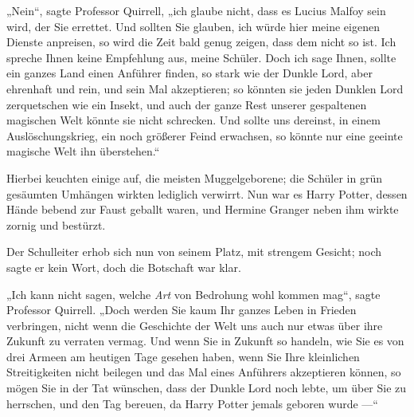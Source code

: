 „Nein“, sagte Professor Quirrell, „ich glaube nicht, dass es Lucius Malfoy sein wird, der Sie errettet. Und sollten Sie glauben, ich würde hier meine eigenen Dienste anpreisen, so wird die Zeit bald genug zeigen, dass dem nicht so ist. Ich spreche Ihnen keine Empfehlung aus, meine Schüler. Doch ich sage Ihnen, sollte ein ganzes Land einen Anführer finden, so stark wie der Dunkle Lord, aber ehrenhaft und rein, und sein Mal akzeptieren; so könnten sie jeden Dunklen Lord zerquetschen wie ein Insekt, und auch der ganze Rest unserer gespaltenen magischen Welt könnte sie nicht schrecken. Und sollte uns dereinst, in einem Auslöschungskrieg, ein noch größerer Feind erwachsen, so könnte nur eine geeinte magische Welt ihn überstehen.“

Hierbei keuchten einige auf, die meisten Muggelgeborene; die Schüler in grün gesäumten Umhängen wirkten lediglich verwirrt. Nun war es Harry Potter, dessen Hände bebend zur Faust geballt waren, und Hermine Granger neben ihm wirkte zornig und bestürzt.

Der Schulleiter erhob sich nun von seinem Platz, mit strengem Gesicht; noch sagte er kein Wort, doch die Botschaft war klar.

„Ich kann nicht sagen, welche \emph{Art} von Bedrohung wohl kommen mag“, sagte Professor Quirrell.
„Doch werden Sie kaum Ihr ganzes Leben in Frieden verbringen, nicht wenn die Geschichte der Welt uns auch nur etwas über ihre Zukunft zu verraten vermag. Und wenn Sie in Zukunft so handeln, wie Sie es von drei Armeen am heutigen Tage gesehen haben, wenn Sie Ihre kleinlichen Streitigkeiten nicht beilegen und das Mal eines Anführers akzeptieren können, so mögen Sie in der Tat wünschen, dass der Dunkle Lord noch lebte, um über Sie zu herrschen, und den Tag bereuen, da Harry Potter jemals geboren wurde —“


